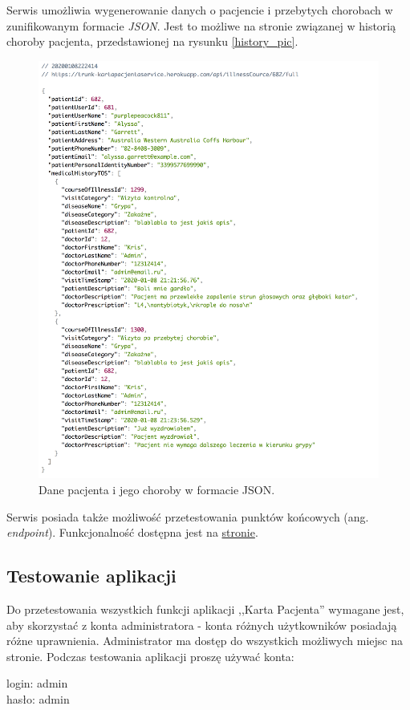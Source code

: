 Serwis umożliwia wygenerowanie danych o pacjencie i przebytych chorobach w zunifikowanym formacie \textit{JSON}. Jest to możliwe na stronie związanej w historią choroby pacjenta, przedstawionej na rysunku \ref{history_pic}.
\begin{figure}[H]
\centering
\includegraphics[width=15cm]{pictures/service/07-json_normal}
\caption{Dane pacjenta i jego choroby w formacie JSON.}
\end{figure}

Serwis posiada także możliwość przetestowania punktów końcowych (ang. \textit{endpoint}). Funkcjonalność dostępna jest na  \href{https://trunk-kartapacjentaservice.herokuapp.com/swagger-ui.html#/}{stronie}.

\subsection{Testowanie aplikacji}
Do przetestowania wszystkich funkcji aplikacji ,,Karta Pacjenta'' wymagane jest, aby skorzystać z konta administratora - konta różnych użytkowników posiadają różne uprawnienia. Administrator ma dostęp do wszystkich możliwych miejsc na stronie. Podczas testowania aplikacji proszę używać konta:\\
\begin{center}
\label{credentials}
login: admin\\
hasło: admin
\end{center}